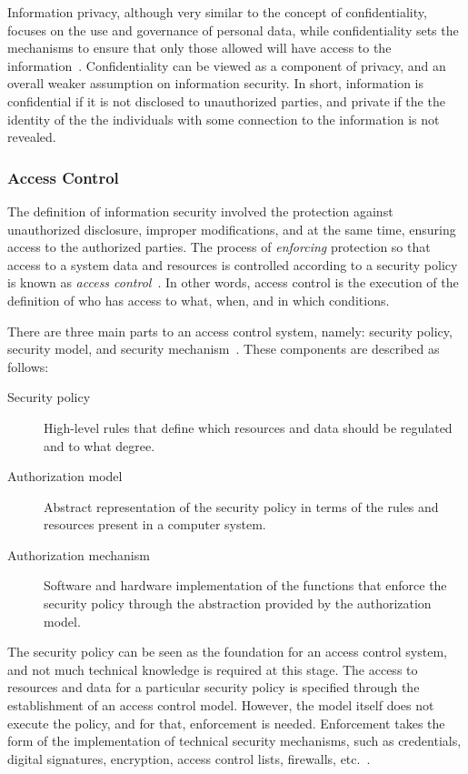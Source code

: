 \documentclass[12pt]{article}
\begin{document}
Information privacy, although very similar to the concept of confidentiality, focuses on the use and governance of personal data, while confidentiality sets the mechanisms to ensure that only those allowed will have access to the information~\cite{heckman}. Confidentiality can be viewed as a component of privacy, and an overall weaker assumption on information security. In short, information is confidential if it is not disclosed to unauthorized parties, and private if the the identity of the the individuals with some connection to the information is not revealed.

\subsubsection{Access Control}

The definition of information security involved the protection against unauthorized disclosure, improper modifications, and at the same time, ensuring access to the authorized parties. The process of \emph{enforcing} protection so that access to a system data and resources is controlled according to a security policy is known as \emph{access control}~\cite{access_02}. In other words, access control is the execution of the definition of who has access to what, when, and in which conditions.

There are three main parts to an access control system, namely: security policy, security model, and security mechanism~\cite{access_02}. These components are described as follows:

\begin{description}
\item[Security policy] High-level rules that define which resources and data should be regulated and to what degree. 
\item[Authorization model] Abstract representation of the security policy in terms of the rules and resources present in a computer system.
\item[Authorization mechanism] Software and hardware implementation of the functions that enforce the security policy through the abstraction provided by the authorization model. 
\end{description}

The security policy can be seen as the foundation for an access control system, and not much technical knowledge is required at this stage. The access to resources and data for a particular security policy is specified through the establishment of an access control model. However, the model itself does not execute the policy, and for that, enforcement is needed. Enforcement takes the form of the implementation of technical security mechanisms, such as credentials, digital signatures, encryption, access control lists, firewalls, etc.~\cite{access_01}.
\end{document}
